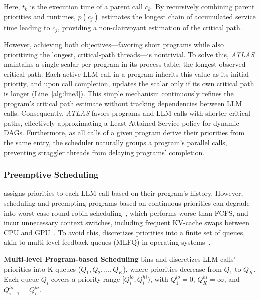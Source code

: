 \noindent Here, \( t_k \) is the execution time of a parent call \( c_k \). By recursively combining parent priorities and runtimes, \( p(c_j) \) estimates the longest chain of accumulated service time leading to \( c_j \), providing a non-clairvoyant estimation of the critical path.

However, achieving both objectives—favoring short programs while also prioritizing the longest, critical-path threads—is nontrivial. To solve this, \textit{ATLAS} maintains a single scalar per program in its process table: the longest observed critical path.  Each active LLM call in a program inherits this value as its initial priority, and upon call completion, updates the scalar only if its own critical path is longer (Line~\ref{alg:line3}). This simple mechanism continuously refines the program’s critical path estimate without tracking dependencies between LLM calls. Consequently, \textit{ATLAS} favors programs and LLM calls with shorter critical paths, effectively approximating a Least-Attained-Service policy for dynamic DAGs. Furthermore, as all calls of a given program derive their priorities from the same entry, the scheduler naturally groups a program’s parallel calls, preventing straggler threads from delaying programs' completion.


\subsubsection{Preemptive Scheduling}

\label{sec:preemption}
\text{\name} assigns priorities to each LLM call based on their program's history. However, scheduling and preempting programs based on continuous priorities can degrade into worst-case round-robin scheduling~\cite{coflow_dag}, which performs worse than FCFS, and incur unnecessary context switches, including frequent KV-cache swaps between CPU and GPU~\cite{fastserve}. To avoid this, \text{\name} discretizes priorities into a finite set of queues, akin to multi-level feedback queues (MLFQ) in operating systems~\cite{coflow_dag, tiresias, arps_ostep_mlfq}.

\vspace{1.5mm}
\noindent \textbf{Multi-level Program-based Scheduling} \text{\name} bins and discretizes LLM calls' priorities into K queues ($Q_1, Q_2, \dots, Q_K$), where priorities decrease from $Q_1$ to $Q_K$. Each queue $Q_i$ covers a priority range $[Q_i^{lo}, Q_i^{hi})$, with $Q_1^{lo}=0$, $Q_K^{hi}=\infty$, and $Q_{i+1}^{lo}=Q_i^{hi}$.


